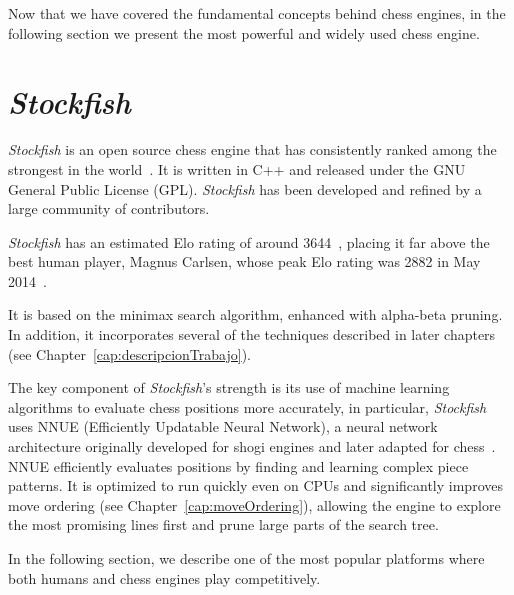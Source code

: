 \noindent Now that we have covered the fundamental concepts behind chess engines, in the following section we present the most powerful and widely used chess engine.

\section{\textit{Stockfish}}\label{sec:stockfish}

\noindent \textit{Stockfish} is an open source chess engine that has consistently ranked among the strongest in the world~\cite{Stockfish}. It is written in C++ and released under the GNU General Public License (GPL). \textit{Stockfish} has been developed and refined by a large community of contributors.

\vspace{1em}

\noindent \textit{Stockfish} has an estimated Elo rating of around 3644~\cite{StockfishElo}, placing it far above the best human player, Magnus Carlsen, whose peak Elo rating was 2882 in May 2014~\cite{MagnusCarlsenElo}.

\vspace{1em}

\noindent It is based on the minimax search algorithm, enhanced with alpha-beta pruning. In addition, it incorporates several of the techniques described in later chapters (see Chapter~\cref{cap:descripcionTrabajo}).

\vspace{1em}

\par The key component of \textit{Stockfish}'s strength is its use of machine learning algorithms to evaluate chess positions more accurately, in particular, \textit{Stockfish} uses NNUE (Efficiently Updatable Neural Network), a neural network architecture originally developed for shogi engines and later adapted for chess~\cite{NNUE}. NNUE efficiently evaluates positions by finding and learning complex piece patterns. It is optimized to run quickly even on CPUs and significantly improves move ordering (see Chapter~\cref{cap:moveOrdering}), allowing the engine to explore the most promising lines first and prune large parts of the search tree.

\vspace{1em}

In the following section, we describe one of the most popular platforms where both humans and chess engines play competitively.

